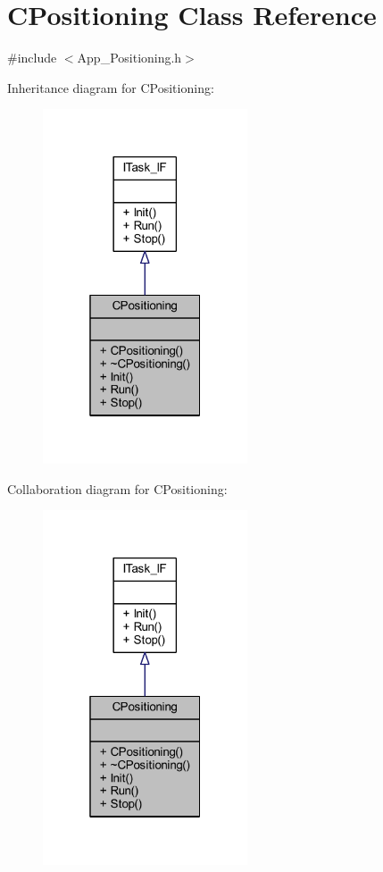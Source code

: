 \hypertarget{class_c_positioning}{}\section{C\+Positioning Class Reference}
\label{class_c_positioning}


{\ttfamily \#include $<$App\+\_\+\+Positioning.\+h$>$}



Inheritance diagram for C\+Positioning\+:
\nopagebreak
\begin{figure}[H]
\begin{center}
\leavevmode
\includegraphics[width=172pt]{class_c_positioning__inherit__graph}
\end{center}
\end{figure}


Collaboration diagram for C\+Positioning\+:
\nopagebreak
\begin{figure}[H]
\begin{center}
\leavevmode
\includegraphics[width=172pt]{class_c_positioning__coll__graph}
\end{center}
\end{figure}
